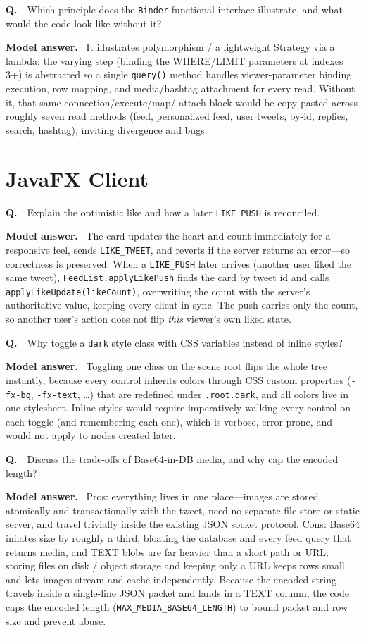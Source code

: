 \documentclass[11pt]{article}
\newcounter{q}
\newcommand{\qa}[2]{%
  \refstepcounter{q}%
  \medskip\par\noindent\textbf{Q\theq.}\ \ #1\par
  \smallskip\noindent\textcolor{answergreen}{\textbf{Model answer.}}\ #2\par
}
\newcommand{\code}[1]{\texttt{#1}}
\begin{document}
\qa{Which principle does the \code{Binder} functional interface illustrate, and what
would the code look like without it?}{%
It illustrates polymorphism / a lightweight Strategy via a lambda: the varying step
(binding the WHERE/LIMIT parameters at indexes 3+) is abstracted so a single
\code{query()} method handles viewer-parameter binding, execution, row mapping, and
media/hashtag attachment for every read. Without it, that same connection/execute/map/
attach block would be copy-pasted across roughly seven read methods (feed, personalized
feed, user tweets, by-id, replies, search, hashtag), inviting divergence and bugs.}

\section{JavaFX Client}

\qa{Explain the optimistic like and how a later \code{LIKE\_PUSH} is reconciled.}{%
The card updates the heart and count immediately for a responsive feel, sends
\code{LIKE\_TWEET}, and reverts if the server returns an error---so correctness is
preserved. When a \code{LIKE\_PUSH} later arrives (another user liked the same tweet),
\code{FeedList.applyLikePush} finds the card by tweet id and calls
\code{applyLikeUpdate(likeCount)}, overwriting the count with the server's authoritative
value, keeping every client in sync. The push carries only the count, so another user's
action does not flip \emph{this} viewer's own liked state.}

\qa{Why toggle a \code{dark} style class with CSS variables instead of inline
styles?}{%
Toggling one class on the scene root flips the whole tree instantly, because every
control inherits colors through CSS custom properties (\code{-fx-bg}, \code{-fx-text},
\ldots) that are redefined under \code{.root.dark}, and all colors live in one
stylesheet. Inline styles would require imperatively walking every control on each
toggle (and remembering each one), which is verbose, error-prone, and would not apply to
nodes created later.}

\qa{Discuss the trade-offs of Base64-in-DB media, and why cap the encoded length?}{%
Pros: everything lives in one place---images are stored atomically and transactionally
with the tweet, need no separate file store or static server, and travel trivially
inside the existing JSON socket protocol. Cons: Base64 inflates size by roughly a third,
bloating the database and every feed query that returns media, and TEXT blobs are far
heavier than a short path or URL; storing files on disk / object storage and keeping only
a URL keeps rows small and lets images stream and cache independently. Because the encoded
string travels inside a single-line JSON packet and lands in a TEXT column, the code caps
the encoded length (\code{MAX\_MEDIA\_BASE64\_LENGTH}) to bound packet and row size and
prevent abuse.}

\vspace{10pt}
\hrule
\vspace{6pt}
\end{document}
